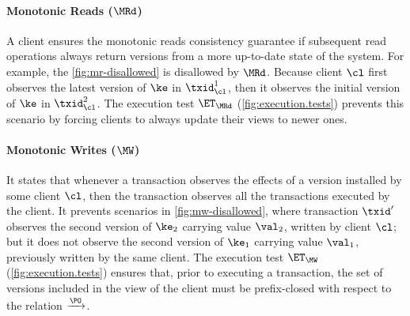 \paragraph{Monotonic Reads ($\MRd$)}
A client ensures the monotonic reads consistency guarantee if subsequent read operations always 
return versions from a more up-to-date state of the system. For example, the \cref{fig:mr-disallowed} is disallowed 
by $\MRd$.
Because client $\cl$ first observes the latest version of $\ke$ in $\txid_{\cl}^{1}$, then it
observes the initial version of $\ke$ in $\txid_{\cl}^{2}$.
The execution test $\ET_{\MRd}$ (\cref{fig:execution.tests}) prevents this scenario by 
forcing clients to always update their views to newer ones. 

\paragraph{Monotonic Writes ($\MW$)}
It states that whenever a transaction observes the effects of a version installed by some client $\cl$, then 
the transaction observes all the transactions executed by the client. It prevents 
scenarios in \cref{fig:mw-disallowed}, where transaction $\txid'$ observes the 
second version of $\ke_2$ carrying value $\val_2$, written by client $\cl$; but it does not observe the second version 
of $\ke_1$ carrying value $\val_1$, previously written by the same client.
The execution test $\ET_{\MW}$ (\cref{fig:execution.tests}) ensures 
that, prior to executing a transaction, the set of versions included in the view of the client 
must be prefix-closed with respect to the relation $\xrightarrow{\PO}$.


